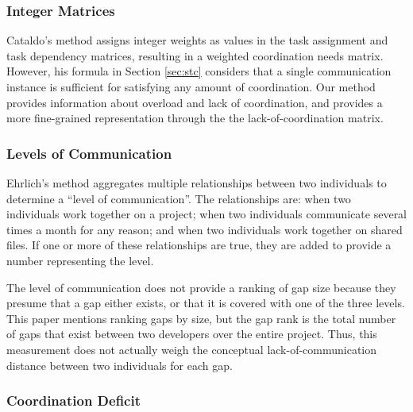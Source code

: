 \subsubsection{Integer Matrices}

Cataldo's method assigns integer weights as values in the task assignment and task dependency matrices, resulting in a weighted coordination needs matrix. However, his formula in Section \ref{sec:stc} considers that a single communication instance is sufficient for satisfying any amount of coordination. Our method provides information about overload and lack of coordination, and provides a more fine-grained representation through the the lack-of-coordination matrix.

\subsubsection{Levels of Communication}

Ehrlich's method aggregates multiple relationships between two individuals to determine a ``level of communication''.  The relationships are: when two individuals work together on a project; when two individuals communicate several times a month for any reason; and when two individuals work together on shared files. If one or more of these relationships are true, they are added to provide a number representing the level.


The level of communication does not provide a ranking of gap size because they presume that a gap either exists, or that it is covered with one of the three levels. This paper mentions ranking gaps by size, but the gap rank is the total number of gaps that exist between two developers over the entire project. Thus, this measurement does not actually weigh the conceptual lack-of-communication distance between two individuals for each gap.

\subsubsection{Coordination Deficit}

